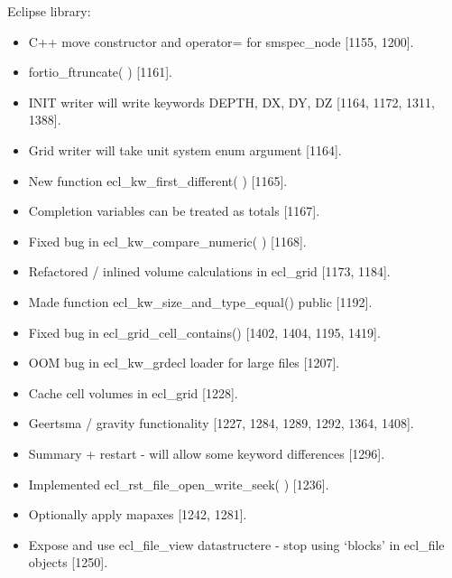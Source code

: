 \documentclass[letterpaper,10pt,english]{sphinxmanual}
\begin{document}
Eclipse library:
\begin{itemize}
\item {} 
C++ move constructor and operator= for smspec\_node {[}1155, 1200{]}.

\item {} 
fortio\_ftruncate( ) {[}1161{]}.

\item {} 
INIT writer will write keywords DEPTH, DX, DY, DZ {[}1164, 1172, 1311, 1388{]}.

\item {} 
Grid writer will take unit system enum argument {[}1164{]}.

\item {} 
New function ecl\_kw\_first\_different( ) {[}1165{]}.

\item {} 
Completion variables can be treated as totals {[}1167{]}.

\item {} 
Fixed bug in ecl\_kw\_compare\_numeric( ) {[}1168{]}.

\item {} 
Refactored / inlined volume calculations in ecl\_grid {[}1173, 1184{]}.

\item {} 
Made function ecl\_kw\_size\_and\_type\_equal() public {[}1192{]}.

\item {} 
Fixed bug in ecl\_grid\_cell\_contains() {[}1402, 1404, 1195, 1419{]}.

\item {} 
OOM bug in ecl\_kw\_grdecl loader for large files {[}1207{]}.

\item {} 
Cache cell volumes in ecl\_grid {[}1228{]}.

\item {} 
Geertsma / gravity functionality {[}1227, 1284, 1289, 1292, 1364, 1408{]}.

\item {} 
Summary + restart - will allow some keyword differences {[}1296{]}.

\item {} 
Implemented ecl\_rst\_file\_open\_write\_seek( ) {[}1236{]}.

\item {} 
Optionally apply mapaxes {[}1242, 1281{]}.

\item {} 
Expose and use ecl\_file\_view datastructere - stop using ‘blocks’ in ecl\_file objects {[}1250{]}.


\end{itemize}
\end{document}
